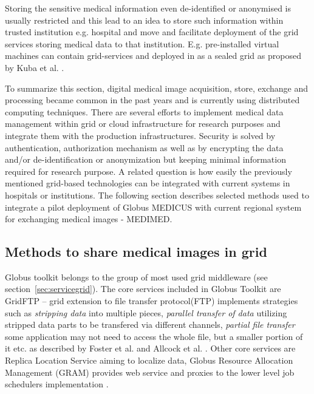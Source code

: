 Storing the sensitive medical information even de-identified or anonymised is usually restricted and this lead to an idea to store such information within trusted institution e.g. hospital and move and facilitate deployment of the grid services storing medical data to that institution. E.g. pre-installed virtual machines can contain grid-services and deployed in as a sealed grid as proposed by Kuba et al. \cite{Kuba2007a}.



To summarize this section, digital medical image acquisition, store, exchange and processing became common in the past years and is currently using distributed computing techniques. There are several efforts to implement medical data management within grid or cloud infrastructure for research purposes and integrate them with the production infrastructures. Security is solved by authentication, authorization mechanism as well as by encrypting the data and/or de-identification or anonymization but keeping minimal information required for research purpose. A related question is  how easily the previously mentioned grid-based technologies can be integrated with current systems in hospitals or institutions. The following section describes selected methods used to integrate a pilot deployment of Globus MEDICUS with current regional system for exchanging medical images - MEDIMED.

\subsection{Methods to share medical images in grid}
\label{sec:methodsimages}

Globus toolkit belongs to the group of most used grid middleware (see section~\ref{sec:servicegrid}). The core services included in Globus Toolkit are GridFTP -- grid extension to file transfer protocol(FTP) implements strategies such as \emph{stripping data} into multiple pieces, \emph{parallel transfer of data} utilizing stripped data parts to be transfered via different channels, \emph{partial file transfer} some application may not need to access the whole file, but a smaller portion of it etc. as described by Foster et al. and Allcock et al. \cite{Foster2006, Allcock2005}. Other core services are Replica Location Service aiming to localize data, Globus Resource Allocation Management (GRAM) provides web service and proxies to the lower level job schedulers implementation \cite{Foster2006}.

